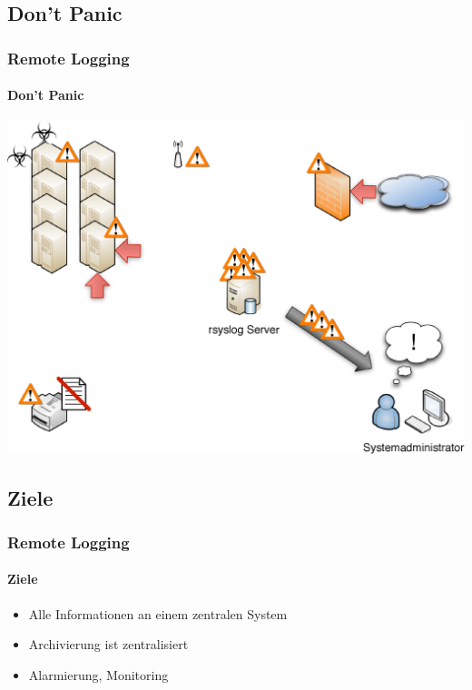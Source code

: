 \subsection{Don't Panic}
\begin{frame}[plain]
	\frametitle{Remote Logging}
	\framesubtitle{Don't Panic}
	\begin{center}
		\includegraphics[width=\linewidth]{images/remote_logging_03.eps}
	\end{center}
\end{frame}


\subsection{Ziele}
\begin{frame}
	\frametitle{Remote Logging}
	\framesubtitle{Ziele}
	\begin{itemize}
		\item Alle Informationen an einem zentralen System
		\item Archivierung ist zentralisiert
		\item Alarmierung, Monitoring
	\end{itemize}
\end{frame}